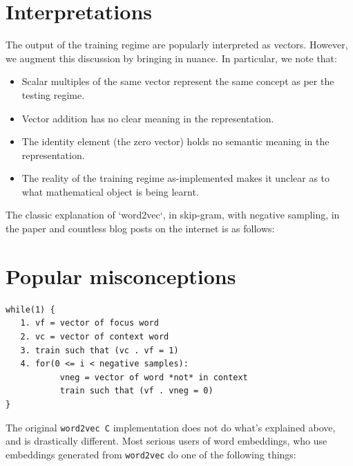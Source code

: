 \documentclass[11pt]{book}
\newcommand{\wtov}{\texttt{word2vec }}
\begin{document}
\section{Interpretations}



The output of the training regime are popularly interpreted as vectors. However,
we augment this discussion by bringing in nuance. In particular, we note that:
\begin{itemize}
\item Scalar multiples of the same vector represent the same concept as per the testing regime.
\item Vector addition has no clear meaning in the representation.
\item The identity element (the zero vector) holds no semantic meaning in the representation.
\item The reality of the training regime as-implemented makes it unclear as to
      what mathematical object is being learnt.
\end{itemize}

The classic explanation of `word2vec`, in skip-gram, with negative sampling,
in the paper and countless blog posts on the internet is as follows:

\section{Popular misconceptions}
\begin{verbatim}
while(1) {
   1. vf = vector of focus word
   2. vc = vector of context word
   3. train such that (vc . vf = 1)
   4. for(0 <= i < negative samples):
           vneg = vector of word *not* in context
           train such that (vf . vneg = 0)
}
\end{verbatim}

% 

The original \wtov \texttt{C} implementation does not do what's explained above,
and is drastically different. Most serious users of word embeddings, who use
embeddings generated from \texttt{word2vec} do one of the following things:
\end{document}
